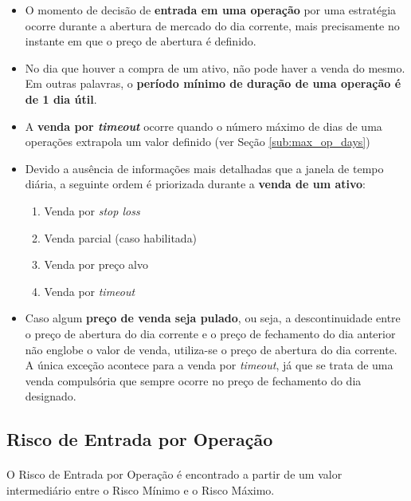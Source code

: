 \begin{itemize}
    \item O momento de decisão de \textbf{entrada em uma operação} por uma estratégia ocorre durante a abertura de mercado do dia corrente, mais precisamente no instante em que o preço de abertura é definido.

    \item No dia que houver a compra de um ativo, não pode haver a venda do mesmo. Em outras palavras, o \textbf{período mínimo de duração de uma operação é de 1 dia útil}.

    \item A \textbf{venda por \textit{timeout}} ocorre quando o número máximo de dias de uma operações extrapola um valor definido (ver Seção \ref{sub:max_op_days})

    \item Devido a ausência de informações mais detalhadas que a janela de tempo diária, a seguinte ordem é priorizada durante a \textbf{venda de um ativo}:

    \begin{enumerate}
        \item Venda por \textit{stop loss}
        \item Venda parcial (caso habilitada)
        \item Venda por preço alvo
        \item Venda por \textit{timeout}
    \end{enumerate}

    \item Caso algum \textbf{preço de venda seja pulado}, ou seja, a descontinuidade entre o preço de abertura do dia corrente e o preço de fechamento do dia anterior não englobe o valor de venda, utiliza-se o preço de abertura do dia corrente. A única exceção acontece para a venda por \textit{timeout}, já que se trata de uma venda compulsória que sempre ocorre no preço de fechamento do dia designado.

\end{itemize}



\FloatBarrier
\subsection{Risco de Entrada por Operação}
\label{sub:operation_risk}

\paragraph{} O Risco de Entrada por Operação é encontrado a partir de um valor intermediário entre o Risco Mínimo e o Risco Máximo.


